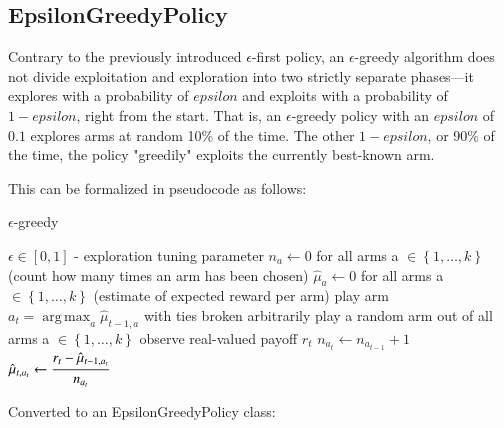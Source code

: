 \documentclass{jss}
\DeclareMathOperator*{\argmax}{arg\,max}
\begin{document}
\subsection{EpsilonGreedyPolicy} \label{epsgreedy}

Contrary to the previously introduced $\epsilon$-first policy, an $\epsilon$-greedy algorithm \cite{Sutton1998e} does not divide exploitation and exploration into two strictly separate phases---it explores with a probability of $epsilon$ and exploits with a probability of $1-epsilon$, right from the start. That is, an $\epsilon$-greedy policy with an $epsilon$ of $0.1$ explores arms at random 10\% of the time. The other $1-epsilon$, or 90\% of the time, the policy "greedily" exploits the currently best-known arm.

This can be formalized in pseudocode as follows:

\begin{algorithm}[H]
\caption{$\epsilon$-greedy}
\label{Alg:EpsilonGreedy}
\begin{algorithmic}
\REQUIRE \(    \epsilon  \in \left[ 0,1 \right] \) - exploration tuning parameter
\STATE \( n_{a} \leftarrow 0 \) for all arms a \(  \in \left\{ 1, \dots, k \right\} \)  (count how many times an arm has been chosen)
\STATE \( \hat{\mu}_{a} \leftarrow 0 \) for all arms a  \(   \in \left\{ 1, \dots, k \right\} \)  (estimate of expected reward per arm)
		\STATE play arm \(a_t = \argmax_a  \hat{\mu}_{t-1,a}  \) with ties broken arbitrarily
	\ELSE
		\STATE play a random arm out of all arms a \(  \in \left\{ 1, \dots, k \right\} \)
	\ENDIF
	\STATE observe real-valued payoff $r_t$
	\STATE \( n_{a_{t}} \leftarrow n_{a_{t-1}} + 1  \)
   \STATE \( \hat{\mu}_{t,a_{t}} \leftarrow   \cfrac{r_t - \hat{\mu}_{t-1,a_{t}} }{n_{a_{t}}}   \)
\ENDFOR
\end{algorithmic}
\end{algorithm}

Converted to an EpsilonGreedyPolicy class:

\end{document}
